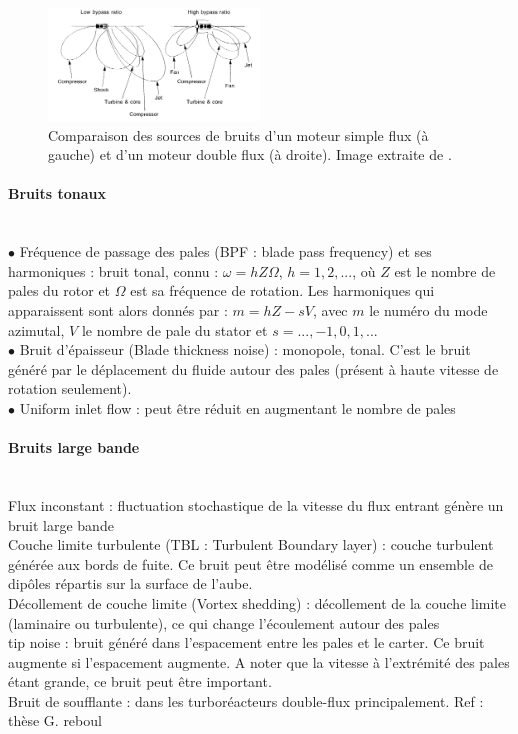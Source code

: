 \begin{figure}[!h]
 \begin{center}
  \includegraphics[width=0.5\textwidth]{img/smith_noise.png}
  \caption{Comparaison des sources de bruits d'un moteur simple flux (à gauche) et d'un moteur double flux (à droite). Image extraite de \cite{Smith1989}.\label{smith}}
 \end{center}
\end{figure}


\paragraph{Bruits tonaux}~\\
	$\bullet$ Fréquence de passage des pales (BPF : blade pass frequency) et ses harmoniques : bruit tonal, connu : $\omega = h Z \Omega$, $h=1,2,...$,  où $Z$ est le nombre de pales du rotor et $\Omega$ est sa fréquence de rotation. Les harmoniques qui apparaissent sont alors donnés par : $m=hZ-sV$, avec $m$ le numéro du mode azimutal, $V$ le nombre de pale du stator et $s=...,-1,0,1,...$\\
	$\bullet$ Bruit d'épaisseur (Blade thickness noise) : monopole, tonal. C'est le bruit généré par le déplacement du fluide autour des pales (présent à haute vitesse de rotation seulement).\\
	$\bullet$ Uniform inlet flow : peut être réduit en augmentant le nombre de pales\\

 

\paragraph{Bruits large bande}~\\
	\tbullet Flux inconstant : fluctuation stochastique de la vitesse du flux entrant génère un bruit large bande\\
	\tbullet Couche limite turbulente (TBL : Turbulent Boundary layer) : couche turbulent générée aux bords de fuite. Ce bruit peut être modélisé comme un ensemble de dipôles répartis sur la surface de l'aube.\\
	\tbullet Décollement de couche limite (Vortex shedding) : décollement de la couche limite (laminaire ou turbulente), ce qui change l'écoulement autour des pales\\
	\tbullet tip noise : bruit généré dans l'espacement entre les pales et le carter. Ce bruit augmente si l'espacement augmente. A noter que la vitesse à l'extrémité des pales étant grande, ce bruit peut être important.\\
	\tbullet Bruit de soufflante : dans les turboréacteurs double-flux principalement. Ref : thèse G. reboul\\


